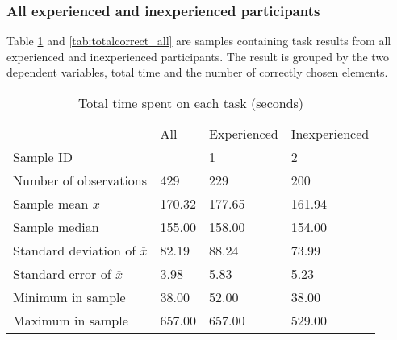 

\subsubsection{All  experienced and inexperienced participants}\label{sec:alltasks}

Table \ref{tab:totaltime_all} and \ref{tab:totalcorrect_all} are samples containing task results from all experienced and inexperienced participants. The result is grouped by the two dependent variables, total time and the number of correctly chosen elements.

\begin{table}[H]
	\centering
	\begin{tabular}{l|l|l|l}
		& All  & Experienced & Inexperienced \\ 
		Sample ID &   & 1  & 2   \\ \hline
		Number of observations & 429    & 229    & 200   \\
		Sample mean $\overline{x}$     & 170.32 & 177.65  & 161.94     \\
		Sample median  & 155.00 & 158.00  & 154.00  \\
		Standard deviation of $\overline{x}$  & 82.19  & 88.24  & 73.99   \\
		Standard error of $\overline{x}$  & 3.98  & 5.83 & 5.23  \\
		Minimum in sample & 38.00  & 52.00  & 38.00     \\
		Maximum in sample & 657.00 & 657.00  & 529.00    \\ \hline
	\end{tabular}
	\caption[Total time, all participants]{Total time spent on each task (seconds)}
	\label{tab:totaltime_all}
\end{table}

